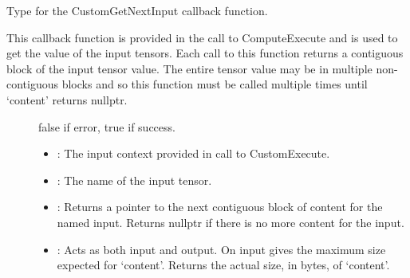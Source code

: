 \documentclass[letterpaper,10pt,english]{sphinxmanual}
\begin{document}
\begin{fulllineitems}
\label{\detokenize{cpp_api/typedef_custom_8h_1aee3723f1a17ff4664691655e056a309c:_CPPv422CustomGetNextInputFn_t}}%
\pysigstartmultiline
{}%
\pysigstopmultiline
Type for the CustomGetNextInput callback function. 

This callback function is provided in the call to ComputeExecute and is used to get the value of the input tensors. Each call to this function returns a contiguous block of the input tensor value. The entire tensor value may be in multiple non-contiguous blocks and so this function must be called multiple times until ‘content’ returns nullptr.

\begin{description}
\item[{}] \leavevmode
false if error, true if success. 

\item[{}] \leavevmode\begin{itemize}
\item {} 
: The input context provided in call to CustomExecute. 

\item {} 
: The name of the input tensor. 

\item {} 
: Returns a pointer to the next contiguous block of content for the named input. Returns nullptr if there is no more content for the input. 

\item {} 
: Acts as both input and output. On input gives the maximum size expected for ‘content’. Returns the actual size, in bytes, of ‘content’. 

\end{itemize}

\end{description}


\end{fulllineitems}
\end{document}

